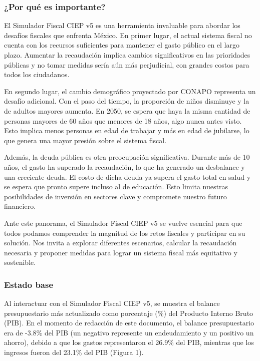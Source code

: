 \hypertarget{por-quuxe9-es-importante}{%
\subsubsection{¿Por qué es importante?}\label{por-quuxe9-es-importante}}

El Simulador Fiscal CIEP v5 es una herramienta invaluable para abordar
los desafíos fiscales que enfrenta México. En primer lugar, el actual
sistema fiscal no cuenta con los recursos suficientes para mantener el
gasto público en el largo plazo. Aumentar la recaudación implica cambios
significativos en las prioridades públicas y no tomar medidas sería aún
más perjudicial, con grandes costos para todos los ciudadanos.

En segundo lugar, el cambio demográfico proyectado por CONAPO representa
un desafío adicional. Con el paso del tiempo, la proporción de niños
disminuye y la de adultos mayores aumenta. En 2050, se espera que haya
la misma cantidad de personas mayores de 60 años que menores de 18 años,
algo nunca antes visto. Esto implica menos personas en edad de trabajar
y más en edad de jubilarse, lo que genera una mayor presión sobre el
sistema fiscal.

Además, la deuda pública es otra preocupación significativa. Durante más
de 10 años, el gasto ha superado la recaudación, lo que ha generado un
desbalance y una creciente deuda. El costo de dicha deuda ya supera el
gasto total en salud y se espera que pronto supere incluso al de
educación. Esto limita nuestras posibilidades de inversión en sectores
clave y compromete nuestro futuro financiero.

Ante este panorama, el Simulador Fiscal CIEP v5 se vuelve esencial para
que todos podamos comprender la magnitud de los retos fiscales y
participar en su solución. Nos invita a explorar diferentes escenarios,
calcular la recaudación necesaria y proponer medidas para lograr un
sistema fiscal más equitativo y sostenible.

\hypertarget{estado-base}{%
\subsubsection{Estado base}\label{estado-base}}

Al interactuar con el Simulador Fiscal CIEP v5, se muestra el balance
presupuestario más actualizado como porcentaje (\%) del Producto Interno
Bruto (PIB). En el momento de redacción de este documento, el balance
presupuestario era de -3.8\% del PIB (un negativo represente un
endeudamiento y un positivo un ahorro), debido a que los gastos
representaron el 26.9\% del PIB, mientras que los ingresos fueron del
23.1\% del PIB (Figura 1).


